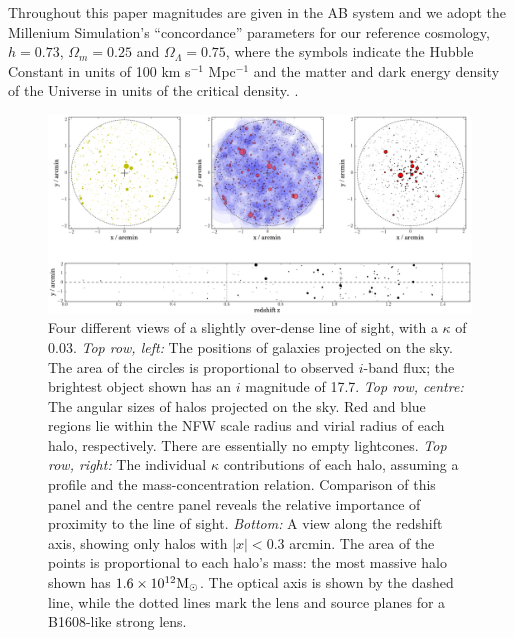 \documentclass[useAMS,usenatbib]{mn2e}
\begin{document}
Throughout this paper magnitudes are given in the AB system and
we adopt the Millenium Simulation's ``concordance'' parameters for our reference cosmology, \ie
$h=0.73$, $\Omega_m=0.25$ and $\Omega_\Lambda=0.75$, where the symbols indicate
the Hubble Constant in units of 100 km s$^{-1}$ Mpc$^{-1}$ and the matter and
dark energy density of the Universe in units of the critical density.
.%



\begin{figure}
\includegraphics[width=\textwidth]{figs/viewofalightcone.eps}
\caption[magcut]{Four different views of a slightly over-dense \MS line
of sight, with a $\kappa$ of 0.03. 
{\it Top row, left:} The positions of galaxies projected on the sky. The area
of the circles is proportional to observed $i$-band flux; the brightest
object shown has an $i$ magnitude of 17.7. 
{\it Top row, centre:} The angular sizes of halos projected on the sky.
Red and blue regions lie within the NFW scale radius and virial radius
of each halo, respectively. There are essentially no empty lightcones. 
{\it Top row, right:} The individual $\kappa$ contributions of
each halo, assuming a \citet{BMO} profile and the \citet{Neto2007}
mass-concentration relation. Comparison of
this panel and the centre panel reveals the relative importance of
proximity to the line of sight.
{\it Bottom:} A view along the redshift axis, showing only halos with
$|x|<0.3$ arcmin. The area of the points is proportional to each halo's
mass: the most massive halo shown has $1.6\times10^{12}\Msun$. The
optical axis is shown by the dashed line, while the dotted lines mark
the lens and source planes for a B1608-like strong lens.}
\label{fig:lightcone}
\end{figure}



\end{document}
